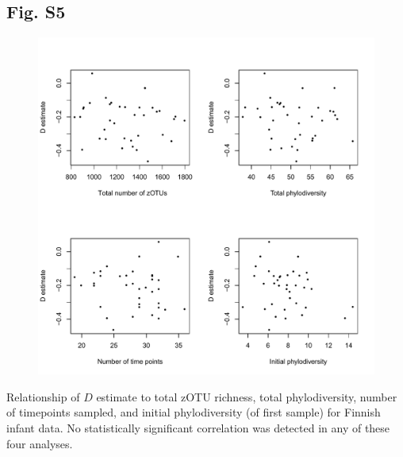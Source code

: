 \documentclass{article}
\begin{document}
{\subsection{Fig. S5}\label{sec:figureS5}
\begin{figure}[ht]
	\centering
	\includegraphics[scale=0.80]{figs/Fig_S5.pdf}
\end{figure}
Relationship of \(D\) estimate to total zOTU richness, total phylodiversity, number of timepoints sampled, and initial phylodiversity (of first sample) for Finnish infant data. No statistically significant correlation was detected in any of these four analyses. 

}%
\end{document}
